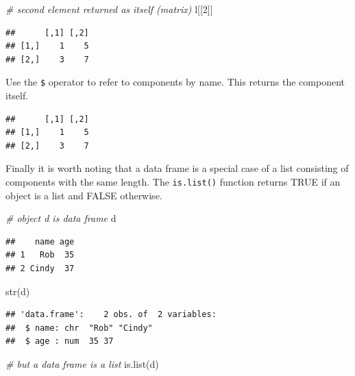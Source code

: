 \documentclass[
]{book}
\newenvironment{Shaded}{\begin{snugshade}}{\end{snugshade}}
\newcommand{\CommentTok}[1]{\textcolor[rgb]{0.56,0.35,0.01}{\textit{#1}}}
\newcommand{\DecValTok}[1]{\textcolor[rgb]{0.00,0.00,0.81}{#1}}
\newcommand{\FunctionTok}[1]{\textcolor[rgb]{0.00,0.00,0.00}{#1}}
\newcommand{\NormalTok}[1]{#1}
\newcommand{\SpecialCharTok}[1]{\textcolor[rgb]{0.00,0.00,0.00}{#1}}
\begin{document}
\begin{Shaded}
\begin{Highlighting}[]
\CommentTok{\# second element returned as itself (matrix)}
\NormalTok{l[[}\DecValTok{2}\NormalTok{]]}
\end{Highlighting}
\end{Shaded}

\begin{verbatim}
##      [,1] [,2]
## [1,]    1    5
## [2,]    3    7
\end{verbatim}

Use the \texttt{\$} operator to refer to components by name. This returns the component itself.

\begin{Shaded}
\end{Shaded}

\begin{verbatim}
##      [,1] [,2]
## [1,]    1    5
## [2,]    3    7
\end{verbatim}

Finally it is worth noting that a data frame is a special case of a list consisting of components with the same length. The \texttt{is.list()} function returns TRUE if an object is a list and FALSE otherwise.

\begin{Shaded}
\begin{Highlighting}[]
\CommentTok{\# object d is data frame}
\NormalTok{d}
\end{Highlighting}
\end{Shaded}

\begin{verbatim}
##    name age
## 1   Rob  35
## 2 Cindy  37
\end{verbatim}

\begin{Shaded}
\begin{Highlighting}[]
\FunctionTok{str}\NormalTok{(d)}
\end{Highlighting}
\end{Shaded}

\begin{verbatim}
## 'data.frame':    2 obs. of  2 variables:
##  $ name: chr  "Rob" "Cindy"
##  $ age : num  35 37
\end{verbatim}

\begin{Shaded}
\begin{Highlighting}[]
\CommentTok{\# but a data frame is a list}
\FunctionTok{is.list}\NormalTok{(d)}
\end{Highlighting}
\end{Shaded}
\end{document}
